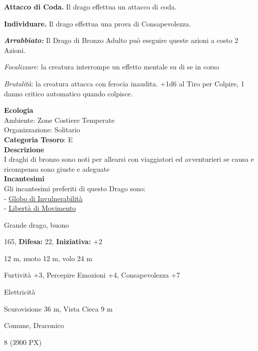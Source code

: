 \begin{multicols}{2}
{\textbf{Attacco di Coda.} Il drago effettua un attacco di coda.

\textbf{Individuare.} Il drago effettua una prova di Consapevolezza.

\emph{\textbf{Arrabbiato:}} Il Drago di Bronzo Adulto può eseguire queste azioni a costo 2 Azioni.

\emph{Focalizzare}: la creatura interrompe un effetto mentale su di se in corso

\emph{Brutalità}: la creatura attacca con ferocia inaudita. +1d6 al Tiro per Colpire, 1 danno critico automatico quando colpisce.

\textbf{Ecologia}\\
Ambiente: Zone Costiere Temperate\\
Organizzazione: Solitario\\
\textbf{Categoria Tesoro}: E\\
\textbf{Descrizione}\\
I draghi di bronzo sono noti per allearsi con viaggiatori ed avventurieri se causa e ricompensa sono giuste e adeguate\\
\textbf{Incantesimi}\\
Gli incantesimi preferiti di questo Drago sono:\\
- \hyperlink{Globo di Invulnerabilità}{Globo di Invulnerabilità}\\
- \hyperlink{Libertà di Movimento}{Libertà di Movimento}


\noindent
\begin{description}[noitemsep, topsep=0pt, parsep=0pt, partopsep=0pt, leftmargin=0cm, labelwidth=2.2cm]
	\item[\textbf{Taglia/Tipo:}] Grande drago, buono
	\item[\textbf{Caratt.:}] 
	\item[\textbf{Punti Ferita:}] 165,  \textbf{Difesa:} 22,  \textbf{Iniziativa:} +2
	\item[\textbf{Movimento:}] 12 m, nuoto 12 m, volo 24 m
	\item[\textbf{Tiri Salvez.:}] 
	\item[\textbf{Comp.:}] Furtività +3, Percepire Emozioni +4, Consapevolezza +7
	\item[\textbf{Imm. Danni:}] Elettricità
	\item[\textbf{Sensi:}] Scurovisione 36 m, Vista Cieca 9 m
	\item[\textbf{Linguaggi:}] Comune, Draconico
	\item[\textbf{Sfida:}] 8 (3900 PX)\smallskip
\end{description}

}
\end{multicols}
